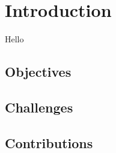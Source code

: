 \chapter{Introduction}
Hello \cite{greenwade93}
\section{Objectives}
\section{Challenges}
\section{Contributions}